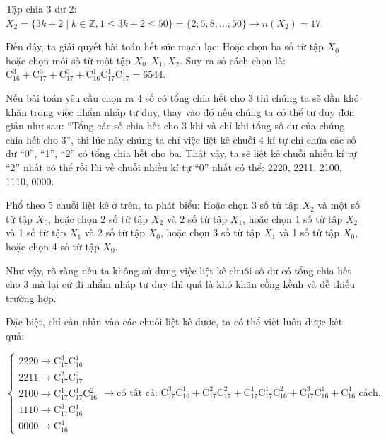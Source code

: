 \documentclass[12pt, a4paper]{article}
\newcommand{\C}[2]{\mathrm{C}_{#1}^{#2}}
\begin{document}
		\noindent Tập chia 3 dư 2: \(X_2 = \{3k + 2 \mid k \in \mathbb{Z}, 1 \le 3k + 2 \le 50\} = \{2; 5; 8; \dots; 50\} \longrightarrow n(X_2) = 17\).
		
		\noindent Đến đây, ta giải quyết bài toán hết sức mạch lạc: Hoặc chọn ba số từ tập \(X_0\) hoặc chọn mỗi số từ một tập \(X_0, X_1, X_2\). Suy ra số cách chọn là: \(\C{16}{3} + \C{17}{3} + \C{17}{3} + \C{16}{1}\C{17}{1}\C{17}{1} = 6544\).
	
		\vspace{0.5cm}
		
	 Nếu bài toán yêu cầu chọn ra 4 số có tổng chia hết cho 3 thì chúng ta sẽ dần khó khăn trong việc nhẩm nháp tư duy, thay vào đó nếu chúng ta có thể tư duy đơn giản như sau: ``Tổng các số chia hết cho 3 khi và chỉ khi tổng số dư của chúng chia hết cho 3'', thì lúc này chúng ta chỉ việc liệt kê chuỗi 4 kí tự chỉ chứa các số dư ``0'', ``1'', ``2'' có tổng chia hết cho ba. Thật vậy, ta sẽ liệt kê chuỗi nhiều kí tự ``2'' nhất có thể rồi lùi về chuỗi nhiều kí tự ``0'' nhất có thể: 2220, 2211, 2100, 1110, 0000.
		
		\noindent Phổ theo 5 chuỗi liệt kê ở trên, ta phát biểu: Hoặc chọn 3 số từ tập \(X_2\) và một số từ tập \(X_0\), hoặc chọn 2 số từ tập \(X_2\) và 2 số từ tập \(X_1\), hoặc chọn 1 số từ tập \(X_2\) và 1 số từ tập \(X_1\) và 2 số từ tập \(X_0\), hoặc chọn 3 số từ tập \(X_1\) và 1 số từ tập \(X_0\), hoặc chọn 4 số từ tập \(X_0\).
		
		\noindent Như vậy, rõ ràng nếu ta không sử dụng việc liệt kê chuỗi số dư có tổng chia hết cho 3 mà lại cứ đi nhẩm nháp tư duy thì quá là khó khăn cồng kềnh và dễ thiếu trường hợp.
		
		\noindent Đặc biệt, chỉ cần nhìn vào các chuỗi liệt kê được, ta có thể viết luôn được kết quả:
		
		\vspace{0.3cm}
		
		\noindent
		$\begin{cases}
			2220 \longrightarrow \C{17}{3}\C{16}{1} \\
			2211 \longrightarrow \C{17}{2}\C{17}{2} \\
			2100 \longrightarrow \C{17}{1}\C{17}{1}\C{16}{2} \\
			1110 \longrightarrow \C{17}{3}\C{16}{1} \\
			0000 \longrightarrow \C{16}{4}
		\end{cases}
		\longrightarrow \text{có tất cả: } \C{17}{3}\C{16}{1} + \C{17}{2}\C{17}{2} + \C{17}{1}\C{17}{1}\C{16}{2} + \C{17}{3}\C{16}{1} + \C{16}{4} \text{ cách.}$
		
\end{document}
